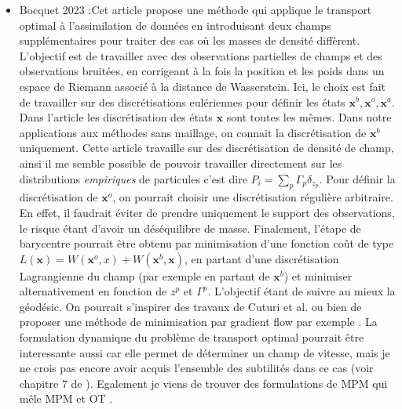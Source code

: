 \documentclass{article}
\newcommand{\bx}{\bm{x}}
\begin{document}
\begin{itemize}
    \item Bocquet 2023  \cite{bocquet_bridging_2023} :Cet article propose une méthode qui applique le transport optimal à l'assimilation de données en introduisant deux champs supplémentaires pour traiter des cas où les masses de densité diffèrent. L'objectif est de travailler avec des observations partielles de champs et des observations bruitées, en corrigeant à la fois la position et les poids dans un espace de Riemann associé à la distance de Wasserstein. Ici, le choix est fait de travailler sur des discrétisations eulériennes pour définir les états $\bx^b, \bx^o, \bx^a$. Dans l'article les discrétisation des états $\bx$ sont toutes les mêmes. Dans notre applications aux méthodes sans maillage, on connait la discrétisation de $\bx^b$ uniquement. Cette article travaille sur des discrétisation de densité de champ, ainsi il me semble possible de pouvoir travailler directement sur les distributions \textit{empiriques} de particules c'est dire $P_i = \sum_{p} \Gamma_p \delta_{z_p}$. Pour définir la discrétisation de $\bx^o$, on pourrait choisir une discrétisation régulière arbitraire. En effet, il faudrait éviter de prendre uniquement le support des observations, le risque étant d'avoir un déséquilibre de masse. Finalement, l'étape de barycentre pourrait être obtenu par minimisation d'une fonction coût de type $L(\bx) = W(\bx^o, x) + W(\bx^b, \bx)$, en partant d'une discrétisation Lagrangienne du champ (par exemple en partant de $\bx^b$) et minimiser alternativement en fonction de $z^p$ et $\Gamma^p$. L'objectif étant de suivre au mieux la géodésic. On pourrait s'inspirer des travaux de Cuturi et al. \cite{cuturi_fast_2014} ou bien de proposer une méthode de minimisation par gradient flow par exemple \cite{liutkus_sliced-wasserstein_2019}. La formulation dynamique du problème de transport optimal pourrait être interessante aussi car elle permet de déterminer un champ de vitesse, mais je ne crois pas encore avoir acquis l'ensemble des subtilités dans ce cas (voir chapitre 7 de \cite{peyre_computational_2020}). Egalement je viens de trouver des formulations de MPM qui mêle MPM et OT \cite{li_optimal_2010}.
\end{itemize}



\end{document}
